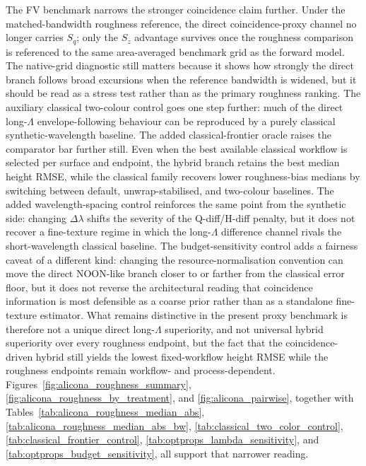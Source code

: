 \documentclass[photonics,article,submit,pdftex,moreauthors]{Definitions/mdpi}
\begin{document}
The FV benchmark narrows the stronger coincidence claim further. Under the matched-bandwidth roughness reference, the direct coincidence-proxy channel no longer carries $S_q$; only the $S_z$ advantage survives once the roughness comparison is referenced to the same area-averaged benchmark grid as the forward model. The native-grid diagnostic still matters because it shows how strongly the direct branch follows broad excursions when the reference bandwidth is widened, but it should be read as a stress test rather than as the primary roughness ranking. The auxiliary classical two-colour control goes one step further: much of the direct long-$\Lambda$ envelope-following behaviour can be reproduced by a purely classical synthetic-wavelength baseline. The added classical-frontier oracle raises the comparator bar further still. Even when the best available classical workflow is selected per surface and endpoint, the hybrid branch retains the best median height RMSE, while the classical family recovers lower roughness-bias medians by switching between default, unwrap-stabilised, and two-colour baselines. The added wavelength-spacing control reinforces the same point from the synthetic side: changing $\Delta\lambda$ shifts the severity of the Q-diff/H-diff penalty, but it does not recover a fine-texture regime in which the long-$\Lambda$ difference channel rivals the short-wavelength classical baseline. The budget-sensitivity control adds a fairness caveat of a different kind: changing the resource-normalisation convention can move the direct NOON-like branch closer to or farther from the classical error floor, but it does not reverse the architectural reading that coincidence information is most defensible as a coarse prior rather than as a standalone fine-texture estimator. What remains distinctive in the present proxy benchmark is therefore not a unique direct long-$\Lambda$ superiority, and not universal hybrid superiority over every roughness endpoint, but the fact that the coincidence-driven hybrid still yields the lowest fixed-workflow height RMSE while the roughness endpoints remain workflow- and process-dependent. Figures~\ref{fig:alicona_roughness_summary}, \ref{fig:alicona_roughness_by_treatment}, and \ref{fig:alicona_pairwise}, together with Tables~\ref{tab:alicona_roughness_median_abs}, \ref{tab:alicona_roughness_median_abs_bw}, \ref{tab:classical_two_color_control}, \ref{tab:classical_frontier_control}, \ref{tab:optprops_lambda_sensitivity}, and \ref{tab:optprops_budget_sensitivity}, all support that narrower reading.
\end{document}
